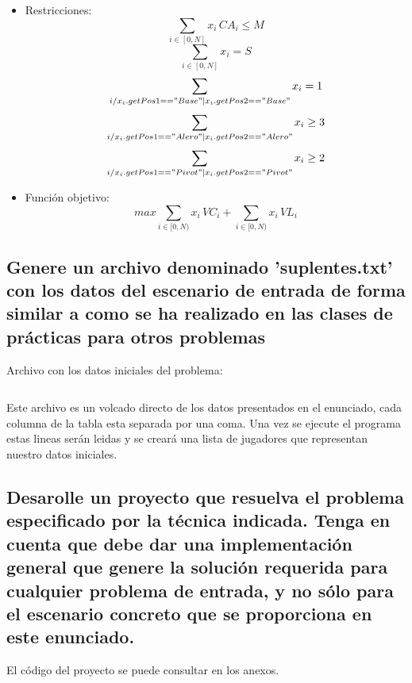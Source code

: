\documentclass[a4paper,12pt]{article}
\begin{document}
\begin{itemize}
\item Restricciones:\\
\setcounter{equation}{0}
\begin{equation}
 \sum_{i \in [0,N]}{x_i \, CA_i} \leq M
\end{equation}
 \begin{equation}
 \sum_{i \in [0,N]}{x_i} = S
\end{equation}
\begin{equation}
 \sum_{i / x_i.getPos1=="Base" | x_i.getPos2=="Base"}{x_i} = 1
\end{equation}
\begin{equation}
 \sum_{i / x_i.getPos1=="Alero" | x_i.getPos2=="Alero"}{x_i} \geq 3
\end{equation}
\begin{equation}
 \sum_{i / x_i.getPos1=="Pivot" | x_i.getPos2=="Pivot"}{x_i} \geq 2
\end{equation}
\item{Función objetivo:}
\begin{equation*}
max  \sum_{i \in [0,N)}{x_i \, VC_i}+\sum_{i \in [0,N)}{x_i \, VL_i}
\end{equation*}
\end{itemize}


\subsection{Genere un archivo denominado 'suplentes.txt' con los datos del escenario de entrada
de forma similar a como se ha realizado en las clases de prácticas para otros problemas}
Archivo con los datos iniciales del problema:

\inputminted[fontsize=\footnotesize,breaklines]{text}{ficheros/suplentes.txt}

Este archivo es un volcado directo de los datos presentados en el enunciado, cada columna de la tabla esta separada por una coma.
Una vez se ejecute el programa estas lineas serán leidas y se creará una lista de jugadores que representan nuestro datos iniciales.
\subsection{Desarolle un proyecto que resuelva el problema especificado por la técnica indicada.
Tenga en cuenta que debe dar una implementación general que genere la solución requerida para
cualquier problema de entrada, y no sólo para el escenario concreto que se proporciona en este enunciado.}
El código del proyecto se puede consultar en los anexos.
\end{document}
